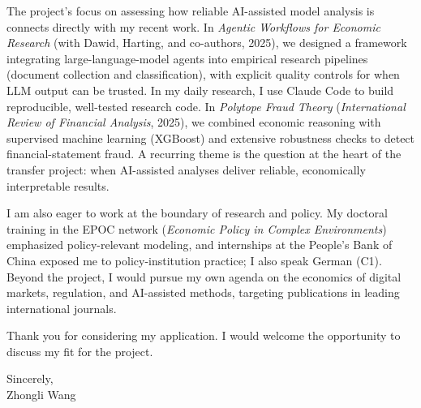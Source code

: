 \documentclass[11pt]{article}
\begin{document}
The project's focus on assessing how reliable AI-assisted model analysis is connects directly with my recent work. In \emph{Agentic Workflows for Economic Research} (with Dawid, Harting, and co-authors, 2025), we designed a framework integrating large-language-model agents into empirical research pipelines (document collection and classification), with explicit quality controls for when LLM output can be trusted. In my daily research, I use Claude Code to build reproducible, well-tested research code. In \emph{Polytope Fraud Theory} (\emph{International Review of Financial Analysis}, 2025), we combined economic reasoning with supervised machine learning (XGBoost) and extensive robustness checks to detect financial-statement fraud. A recurring theme is the question at the heart of the transfer project: when AI-assisted analyses deliver reliable, economically interpretable results.

I am also eager to work at the boundary of research and policy. My doctoral training in the EPOC network (\emph{Economic Policy in Complex Environments}) emphasized policy-relevant modeling, and internships at the People's Bank of China exposed me to policy-institution practice; I also speak German (C1). Beyond the project, I would pursue my own agenda on the economics of digital markets, regulation, and AI-assisted methods, targeting publications in leading international journals.

Thank you for considering my application. I would welcome the opportunity to discuss my fit for the project.

\vspace{0.15cm}

\noindent Sincerely,\\[0.4cm]
\noindent Zhongli Wang
\end{document}
